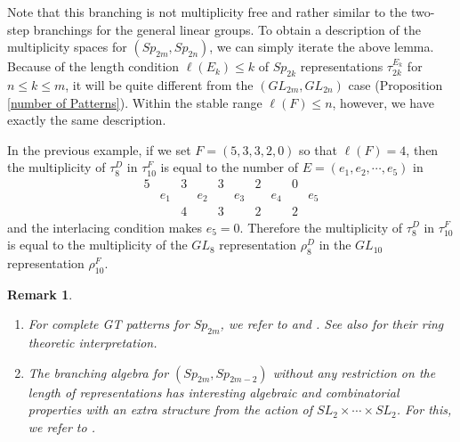 \documentclass[11pt]{amsart}
\numberwithin{equation}{subsection}
\newtheorem{remark}[theorem]{Remark}
\begin{document}
\smallskip

Note that this branching is not multiplicity free and rather similar to the
two-step branchings for the general linear groups. To obtain a description
of the multiplicity spaces for $({Sp}_{2m},{Sp}_{2n})$, we can simply
iterate the above lemma. Because of the length condition 
$\ell (E_{k})\leq k$ of ${Sp}_{2k}$ representations $\tau _{2k}^{E_{k}}$ 
for $n\leq k\leq m$, it will be quite different from the $(GL_{2m}, GL_{2n})$ case 
(Proposition \ref{number of Patterns}). Within the stable 
range $\ell (F)\leq n$, however, we have exactly the same description.

In the previous example, if we set $F=(5,3, 3, 2, 0)$ so that $\ell(F)=4$, then 
the multiplicity of $\tau_{8}^{D}$ in $\tau_{10}^{F}$ is equal to the number of 
$E=(e_1, e_2, \cdots, e_5)$ in 
\begin{equation*}
\begin{array}{cccccccccc}
5 &  & 3 &  & 3 &  & 2 &  & 0 &  \\ 
   & e_{1} &  & e_{2} &  & e_{3} &  & e_{4} &  & e_{5} \\ 
&  & 4 &  & 3 &  & 2 &  & 2 &  \end{array}\end{equation*}
and the interlacing condition makes $e_5 =0$. Therefore the multiplicity
of $\tau_{8}^{D}$ in $\tau_{10}^{F}$ is equal to the multiplicity of
the $GL_8$ representation $\rho_{8}^{D}$ in the $GL_{10}$ representation $\rho_{10}^F$.


\begin{remark}
\begin{enumerate}
\item For complete GT patterns for $Sp_{2m}$, we refer to
\cite{Kir88} and \cite{Pr94}. See also \cite{Ki08} for their ring theoretic interpretation. 

\item The branching algebra for $(Sp_{2m}, Sp_{2m-2})$ without any restriction on 
the length of representations has interesting algebraic and combinatorial properties 
with an extra structure from the action of $SL_2 \times \cdots \times SL_2$. 
For this, we refer to \cite{KY11}.
\end{enumerate}
\end{remark}
\end{document}
